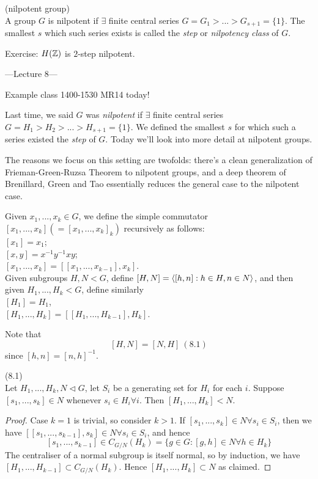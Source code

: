\documentclass[a4paper]{article}
\begin{document}
\begin{defi} (nilpotent group)\\
A group $G$ is nilpotent if $\exists$ finite central series $G=G_1 >...>G_{s+1} = \{1\}$. The smallest $s$ which such series exists is called the \emph{step} or \emph{nilpotency class} of $G$.
\end{defi}

Exercise: $H(\mathbb{Z})$ is $2$-step nilpotent. 

---Lecture 8---

Example class 1400-1530 MR14 today!

Last time, we said $G$ was \emph{nilpotent} if $\exists $ finite central series $G=H_1 > H_2 > ... >H_{s+1} = \{1\}$. We defined the smallest $s$ for which such a series existed the \emph{step} of $G$. Today we'll look into more detail at nilpotent groups.

The reasons we focus on this setting are twofolds: there's a clean generalization of Frieman-Green-Ruzsa Theorem to nilpotent groups, and a deep theorem of Brenillard, Green and Tao essentially reduces the general case to the nilpotent case.

Given $x_1,...,x_k \in G$, we define the simple commutator $[x_1,...,x_k] (= [x_1,...,x_k]_k) $ recursively as follows:\\
$[x_1] = x_1$;\\
$[x,y] = x^{-1}y^{-1}xy$;\\
$[x_1,...,x_k] = [[x_1,...,x_{k-1}],x_k]$.\\
Given subgroups $H,N < G$, define $[H,N] = \langle[h,n]:h \in H,n \in N\rangle$, and then given $H_1,...,H_k <G$, define similarly\\
$[H_1] = H_1$,\\
$[H_1,...,H_k] = [[H_1,...,H_{k-1}],H_k]$.

Note that
\[
[H,N] = [N,H] \ (8.1)
\]
since $[h,n] = [n,h]^{-1}$.

\begin{lemma} (8.1)\\
Let $H_1,...,H_k,N \triangleleft G$, let $S_i$ be a generating set for $H_i$ for each $i$. Suppose $[s_1,...,s_k] \in N$ whenever $s_i \in H_i \forall i$. Then $[H_1,...,H_k] < N$.
\begin{proof}
Case $k=1$ is trivial, so consider $k>1$. If $[s_1,...,s_k] \in N \forall s_i \in S_i$, then we have $[[s_1,...,s_{k-1}],s_k] \in N \forall s_i \in S_i$, and hence 
\[
[s_1,...,s_{k-1}] \in C_{G/N} (H_k) = \{g \in G: [g,h] \in N \forall h \in H_k\}
\]
The centraliser of a normal subgroup is itself normal, so by induction, we have $[H_1,...,H_{k-1}] \subset C_{G/N} (H_k)$. Hence $[H_1,...,H_k] \subset N$ as claimed.
\end{proof}
\end{lemma}
\end{document}
